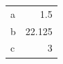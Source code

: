 \documentclass{article}
\begin{document}
\begin{longtable}{lD{.}{.}{4}}
a & 1.5 \\
b & 22.125 \\
c & 3
\end{longtable}
\end{document}
